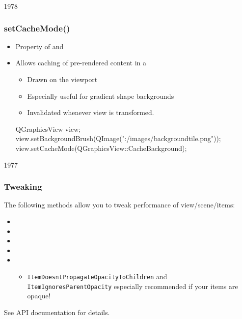 \begin{slide}[fragile]{1978}


\frametitle{setCacheMode()}
\begin{itemize}
\item Property of  and 

\item Allows caching of pre-rendered content in a 

    \begin{itemize}
    \item Drawn on the viewport
    \item Especially useful for gradient shape backgrounds
    \item Invalidated whenever view is transformed.
    \end{itemize}
\begin{cpp}
 QGraphicsView view;
 view.setBackgroundBrush(QImage(":/images/backgroundtile.png"));
 view.setCacheMode(QGraphicsView::CacheBackground);
\end{cpp}
\end{itemize}
\end{slide}



\begin{slide}{1977}

\frametitle{Tweaking}
The following methods allow you to tweak performance of view/scene/items:
\begin{itemize}
\item {}

\item {}

\item {}

\item {}

\item {}

    \begin{itemize}
    \item \texttt{ItemDoesntPropagateOpacityToChildren} and \texttt{ItemIgnoresParentOpacity} especially recommended if your items are opaque! 
    \end{itemize}
\end{itemize}
See API documentation for details. 
\end{slide}



